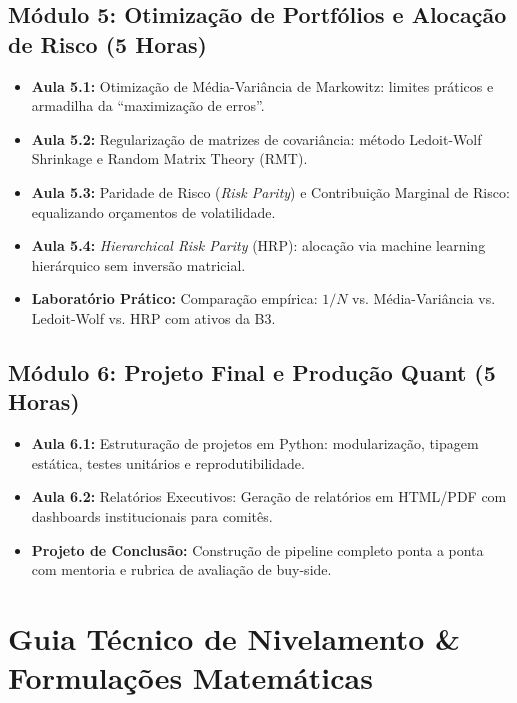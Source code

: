 \documentclass[11pt,a4paper]{article}
\begin{document}
\subsection*{Módulo 5: Otimização de Portfólios e Alocação de Risco (5 Horas)}
\begin{itemize}[leftmargin=1.5em]
    \item \textbf{Aula 5.1:} Otimização de Média-Variância de Markowitz: limites práticos e armadilha da ``maximização de erros''.
    \item \textbf{Aula 5.2:} Regularização de matrizes de covariância: método Ledoit-Wolf Shrinkage e Random Matrix Theory (RMT).
    \item \textbf{Aula 5.3:} Paridade de Risco (\textit{Risk Parity}) e Contribuição Marginal de Risco: equalizando orçamentos de volatilidade.
    \item \textbf{Aula 5.4:} \textit{Hierarchical Risk Parity} (HRP): alocação via machine learning hierárquico sem inversão matricial.
    \item \textbf{Laboratório Prático:} Comparação empírica: $1/N$ vs. Média-Variância vs. Ledoit-Wolf vs. HRP com ativos da B3.
\end{itemize}

\subsection*{Módulo 6: Projeto Final e Produção Quant (5 Horas)}
\begin{itemize}[leftmargin=1.5em]
    \item \textbf{Aula 6.1:} Estruturação de projetos em Python: modularização, tipagem estática, testes unitários e reprodutibilidade.
    \item \textbf{Aula 6.2:} Relatórios Executivos: Geração de relatórios em HTML/PDF com dashboards institucionais para comitês.
    \item \textbf{Projeto de Conclusão:} Construção de pipeline completo ponta a ponta com mentoria e rubrica de avaliação de buy-side.
\end{itemize}

\vspace{10pt}

\section{Guia Técnico de Nivelamento \& Formulações Matemáticas}
\end{document}
